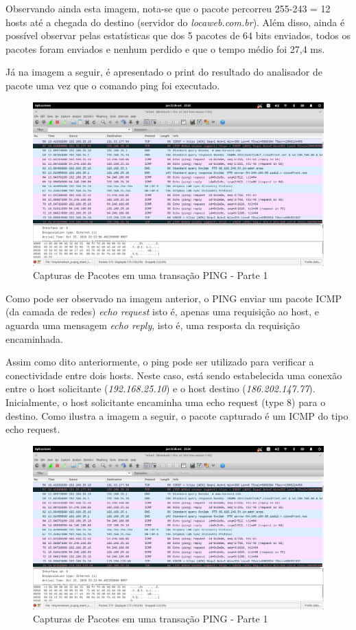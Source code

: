 Observando ainda esta imagem, nota-se que o pacote percorreu 255-243 = 12 hosts até a chegada do destino (servidor do \emph{locaweb.com.br}). Além disso, ainda é possível observar pelas estatísticas que dos 5 pacotes de 64 bits enviados, todos os pacotes foram enviados e nenhum perdido e que o tempo médio foi 27,4 ms.

Já na imagem a seguir, é apresentado o print do resultado do analisador de pacote uma vez que o comando ping foi executado.

  \begin{figure}[h]
    \centering

    \includegraphics[width=450px, scale=1]{figuras/ping}
    \caption{Capturas de Pacotes em uma transação PING - Parte 1}

 \label{fig:2}
  \end{figure}

Como pode ser observado na imagem anterior, o PING enviar um pacote ICMP (da camada de redes) \emph{echo request} isto é, apenas uma requisição ao host, e aguarda uma mensagem \emph{echo reply}, isto é, uma resposta da requisição encaminhada.
	
Assim como dito anteriormente, o ping pode ser utilizado para verificar a conectividade entre dois hosts. Neste caso, está sendo estabelecida uma conexão entre o host solicitante (\emph{192.168.25.10}) e o host destino (\emph{186.202.147.77}). Inicialmente, o host solicitante encaminha uma echo request (type 8) para o destino. Como ilustra a imagem a seguir, o pacote capturado é um ICMP do tipo echo request.

  \begin{figure}[h]
    \centering

    \includegraphics[width=450px, scale=1]{figuras/ping}
    \caption{Capturas de Pacotes em uma transação PING - Parte 1}

 \label{fig:2}
  \end{figure}

